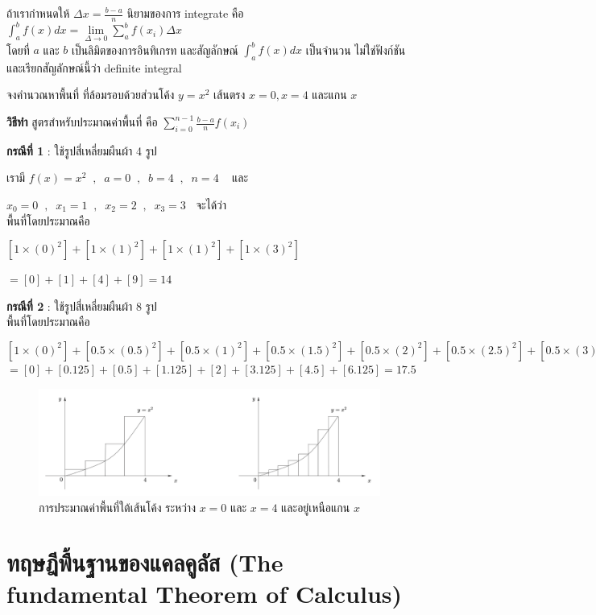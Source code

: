 \documentclass[
]{book}
\begin{document}
ถ้าเรากำหนดให้ \(\Delta x=\frac{b-a}{n}\) นิยามของการ integrate คือ
\(\int^b_af(x)dx=
\lim\limits_{\Delta\rightarrow 0}\sum_a^bf(x_i)\Delta x\)\\
โดยที่ \(a\) และ \(b\) เป็นลิมิตของการอินทิเกรท และสัญลักษณ์ \(\int^b_af(x)dx\)
เป็นจำนวน ไม่ใช่ฟังก์ชัน และเรียกสัญลักษณ์นี้ว่า definite integral

จงคำนวณหาพื้นที่ ที่ล้อมรอบด้วยส่วนโค้ง \(y=x^2\) เส้นตรง \(x=0,x=4\) และแกน \(x\)

\textbf{วิธีทำ} สูตรสำหรับประมาณค่าพื้นที่ คือ
\(\sum_{i=0}^{n-1}\frac{b-a}{n}f(x_i)\)

\textbf{กรณีที่ 1} : ใช้รูปสี่เหลี่ยมผืนผ้า 4 รูป

เรามี \(f(x)=x^2\;\;,\;\;a=0\;\;,\;\;b=4\;\;,\;\;n=4\;\;\;\) และ

\(x_0=0\;\;,\;\;x_1=1\;\;,\;\;x_2=2\;\;,\;\;x_3=3\;\;\) จะได้ว่า\\
พื้นที่โดยประมาณคือ

\([1\times (0)^2]+[1\times (1)^2]+[1\times (1)^2]+ [1\times (3)^2]\)

\(=[0]+[1]+[4]+[9]=14\)

\textbf{กรณีที่ 2} : ใช้รูปสี่เหลี่ยมผืนผ้า 8 รูป\\
พื้นที่โดยประมาณคือ

\([1\times (0)^2]+[0.5\times (0.5)^2]+[0.5\times (1)^2]+ [0.5\times (1.5)^2]+ [0.5\times (2)^2]+ [0.5\times (2.5)^2]+ [0.5\times (3)^2]= [0.5\times (3.5)^2]\)\\
\(=[0]+[0.125]+[0.5]+[1.125]+[2]+[3.125]+[4.5]+[6.125]=17.5\)

\begin{figure}
\includegraphics[width=1\linewidth]{images/fig-area-3} \caption{การประมาณค่าพื้นที่ใต้เส้นโค้ง ระหว่าง $x=0$ และ $x=4$ และอยู่เหนือแกน $x$}\label{fig:fig-area-3}
\end{figure}

\section{ทฤษฎีพื้นฐานของแคลคูลัส (The fundamental Theorem of
Calculus)}\label{uxe17uxe24uxe29uxe0euxe1euxe19uxe10uxe32uxe19uxe02uxe2duxe07uxe41uxe04uxe25uxe04uxe25uxe2a-the-fundamental-theorem-of-calculus}
\end{document}
